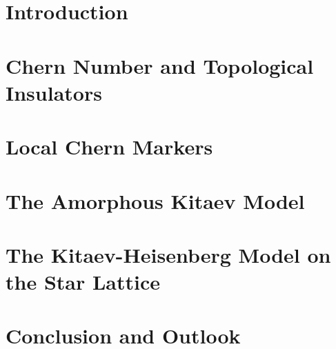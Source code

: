 \documentclass[a4paper,12pt,twoside]{report}
\begin{document}
\body
\begin{refsection}
    \chapter{Introduction} \label{chap:introduction}
     

    \chapter{Chern Number and Topological Insulators}\label{chap:chern_intro}
    

    \chapter{Local Chern Markers} \label{chap:local_markers}
    

    \chapter{The Amorphous Kitaev Model}\label{chap:amorphous_kitaev}
    

    \chapter{The Kitaev-Heisenberg Model on the Star Lattice}
    

    \chapter{Conclusion and Outlook} \label{chap:outlook}
    
    
    \printbibliography[]
    
\end{refsection}

\appendix



\end{document}
